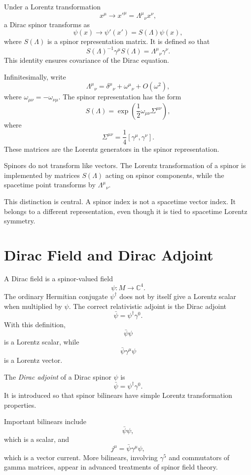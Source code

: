 Under a Lorentz transformation
\[
    x^\mu\longrightarrow x'^\mu=\Lambda^\mu{}_{\nu}x^\nu,
\]
a Dirac spinor transforms as
\[
    \psi(x)\longrightarrow \psi'(x')=S(\Lambda)\psi(x),
\]
where \(S(\Lambda)\) is a spinor representation matrix. It is defined so that
\[
    S(\Lambda)^{-1}\gamma^\mu S(\Lambda)
    =\Lambda^\mu{}_{\nu}\gamma^\nu.
\]
This identity ensures covariance of the Dirac equation.

Infinitesimally, write
\[
    \Lambda^\mu{}_{\nu}=\delta^\mu{}_{\nu}+\omega^\mu{}_{\nu}+O(\omega^2),
\]
where \(\omega_{\mu\nu}=-\omega_{\nu\mu}\). The spinor representation has the
form
\[
    S(\Lambda)=\exp\left(\frac{1}{2}\omega_{\mu\nu}\Sigma^{\mu\nu}\right),
\]
where
\[
    \Sigma^{\mu\nu}=\frac{1}{4}[\gamma^\mu,\gamma^\nu].
\]
These matrices are the Lorentz generators in the spinor representation.

\begin{remarkbox}
Spinors do not transform like vectors. The Lorentz transformation of a spinor is
implemented by matrices \(S(\Lambda)\) acting on spinor components, while the
spacetime point transforms by \(\Lambda^\mu{}_{\nu}\).
\end{remarkbox}

This distinction is central. A spinor index is not a spacetime vector index. It
belongs to a different representation, even though it is tied to spacetime
Lorentz symmetry.

\section{Dirac Field and Dirac Adjoint}

A Dirac field is a spinor-valued field
\[
    \psi:M\to\mathbb{C}^4.
\]
The ordinary Hermitian conjugate \(\psi^\dagger\) does not by itself give a
Lorentz scalar when multiplied by \(\psi\). The correct relativistic adjoint is
the Dirac adjoint
\[
    \bar\psi=\psi^\dagger\gamma^0.
\]
With this definition,
\[
    \bar\psi\psi
\]
is a Lorentz scalar, while
\[
    \bar\psi\gamma^\mu\psi
\]
is a Lorentz vector.

\begin{definitionbox}
The \emph{Dirac adjoint} of a Dirac spinor \(\psi\) is
\[
    \bar\psi=\psi^\dagger\gamma^0.
\]
It is introduced so that spinor bilinears have simple Lorentz transformation
properties.
\end{definitionbox}

Important bilinears include
\[
    \bar\psi\psi,
\]
which is a scalar, and
\[
    j^\mu=\bar\psi\gamma^\mu\psi,
\]
which is a vector current. More bilinears, involving \(\gamma^5\) and
commutators of gamma matrices, appear in advanced treatments of spinor field
theory.

